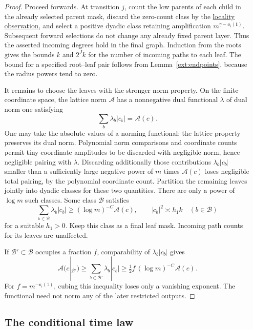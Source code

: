 \begin{proof}
Proceed forwards. At transition \(j\), count the low parents of
each child in the already selected parent mask, discard the
zero-count class by the
\hyperref[ext:diagram-locality]{locality observation}, and select a positive
dyadic class retaining amplification \(m^{\gamma-o_i(1)}\). Subsequent forward
selections do not change any already fixed parent layer.
Thus the asserted incoming degrees hold in the final graph.
Induction from the roots gives the bounds \(k\) and \(2^Jk\)
for the number of incoming paths to each leaf. The bound for
a specified root--leaf pair follows from
Lemma~\ref{ext:endpoints}, because the radius powers tend to zero.

It remains to choose the leaves with the stronger norm property.
On the finite coordinate space, the lattice norm
\(\mathcal A\) has a nonnegative dual functional \(\lambda\) of
dual norm one satisfying
\[
                       \sum_b\lambda_b|c_b|=\mathcal A(c).
\]
One may take the absolute values of a norming functional:
the lattice property preserves its dual norm. Polynomial norm
comparisons and coordinate counts permit tiny coordinate amplitudes
to be discarded with negligible norm, hence negligible pairing with
\(\lambda\). Discarding additionally those contributions
\(\lambda_b|c_b|\) smaller than a sufficiently large negative power
of \(m\) times \(\mathcal A(c)\) loses negligible total pairing, by
the polynomial coordinate count. Partition the remaining leaves jointly into dyadic
classes for these two quantities. There are only a power of
\(\log m\) such classes. Some class \(\mathcal B\) satisfies
\[
 \sum_{b\in\mathcal B}\lambda_b|c_b|
       \geq (\log m)^{-C}\mathcal A(c),
 \qquad
 |c_b|^2\asymp h_1k\quad(b\in\mathcal B)
\]
for a suitable \(h_1>0\). Keep this class as a final leaf mask.
Incoming path counts for its leaves are unaffected.

If \(\mathcal B'\subset\mathcal B\) occupies a fraction \(f\),
comparability of \(\lambda_b|c_b|\) gives
\[
 \mathcal A(c|_{\mathcal B'})
 \geq \sum_{b\in\mathcal B'}\lambda_b|c_b|
 \geq \tfrac12 f\,(\log m)^{-C}\mathcal A(c).
\]
For \(f=m^{-o_i(1)}\), cubing this inequality loses only a
vanishing exponent. The functional need not norm any of the
later restricted outputs.
\end{proof}

\subsection{The conditional time law}

